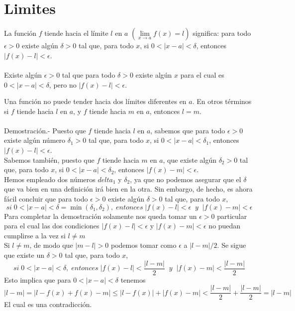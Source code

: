 \chapter{Limites}

\begin{tcolorbox}[colframe=white]
    \begin{def.}
	La función $f$ tiende hacia el límite $l$ en $a$ $\left(\lim\limits_{x \to a} f(x) = l \right)$ significa: para todo $\epsilon > 0$ existe algún $\delta > 0$ tal que, para todo $x$, si $0<|x-a|<\delta$, entonces $|f(x)-l|<\epsilon$.\\\\
	Existe algún $\epsilon >0$ tal que para todo $\delta > 0$ existe algún $x$ para el cual es $0<|x-a|<\delta$, pero no $|f(x)-l|<\epsilon$.
    \end{def.}
\end{tcolorbox}
\vspace{.5cm}

\begin{teo}
Una función no puede tender hacia dos límites diferentes en $a$. En otros términos si $f$ tiende hacia $l$ en $a$, y $f$ tiende hacia $m$ en $a$, entonces $l=m$.\\\\
    Demostración.-\; Puesto que $f$ tiende hacia $l$ en $a$, sabemos que para todo $\epsilon>0$ existe algún número $\delta_1 >0$ tal que, para todo $x$, si $0<|x-a|<\delta_1$, entonces $|f(x)-l|<\epsilon$.\\
    Sabemos también, puesto que $f$ tiende hacia $m$ en $a$, que existe algún $\delta_2 >0$ tal que, para todo $x$, si $0<|x-a|<\delta_2$, entonces $|f(x)-m|<\epsilon$.\\
    Hemos empleado dos números $delta_1$ y $\delta_2$, ya que no podemos asegurar que el $\delta$ que va bien en una definición irá bien en la otra. Sin embargo, de hecho, es ahora fácil concluir que para todo $\epsilon>0$ existe algún $\delta >0$ tal que, para todo $x$, $$si \; 0<|x-a|<\delta=\min(\delta_1,\delta_2), \; entonces \; |f(x)-l|<\epsilon \;\; y \;\; |f(x)-m|<\epsilon$$  
    Para completar la demostración solamente nos queda tomar un $\epsilon>0$ particular para el cual las dos condiciones $|f(x)-l|<\epsilon$ y $|f(x)-m|<\epsilon$ no puedan cumplirse a la vez si $l\neq m$\\
    Si $l\neq m$, de modo que $|m-l|>0$ podemos tomar como $\epsilon$ a $|l-m|/2$. Se sigue que existe un  $\delta > 0$ tal que, para todo $x$, $$si \; 0<|x-a|<\delta, \; entonces \; |f(x)-l|<\dfrac{|l-m|}{2} \; \; y \; \; |f(x)-m|<\dfrac{|l-m|}{2}$$
    Esto implica que para $0<|x-a|<\delta$ tenemos $$|l-m| = |l - f(x) + f(x) -m|\leq |l-f(x)| + |f(x)-m|<\dfrac{|l-m|}{2}+\dfrac{|l-m|}{2}=|l-m|$$ El cual es una contradicción.\\\\
\end{teo}
\vspace{.5cm}

